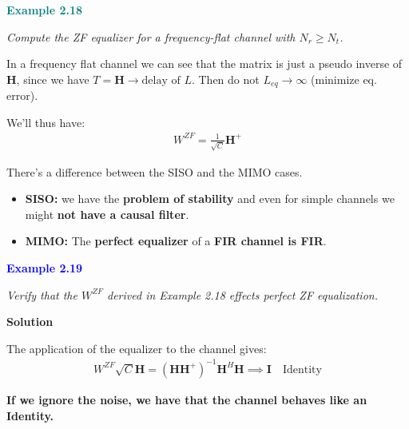 \documentclass[a4paper, 12pt]{book}
\begin{document}
\begin{tcolorbox}[colback=teal!5, colframe=teal, boxrule=0.5pt, sharp corners]
    \textbf{\textcolor{teal}{ Example 2.18}}
    \vspace{0.5em}
    
    \textit{Compute the ZF equalizer for a frequency-flat channel with $N_r \geq N_t$.}
    \vspace{0.5em}
    
    In a frequency flat channel we can see that the matrix is just a pseudo inverse of $\mathbf{H}$, since we have $T = \mathbf{H} \rightarrow \text{delay of } L$.
    Then do not $L_{eq} \to \infty$ (minimize eq. error).
    
    We'll thus have:
    \begin{align}
        W^{ZF} = \frac{1}{\sqrt{C}} \mathbf{H}^+
    \end{align}
\end{tcolorbox}

There's a difference between the SISO and the MIMO cases.
\begin{itemize}
    \item \textbf{SISO:} we have the \textbf{problem of stability} and even for simple channels we might \textbf{not have a causal filter}.
    \item \textbf{MIMO:} The \textbf{perfect equalizer} of a \textbf{FIR channel is FIR}.
\end{itemize}

\begin{tcolorbox}[colback=blue!5, colframe=blue, boxrule=0.5pt, sharp corners]
    \textbf{\textcolor{blue}{ Example 2.19}}
    \vspace{0.5em}
    
    \textit{Verify that the $W^{ZF}$ derived in Example 2.18 effects perfect ZF equalization.}
    \vspace{0.5em}
    
    \textbf{Solution}
    
    The application of the equalizer to the channel gives:
    \begin{align}
        W^{ZF}\sqrt{C}\mathbf{H} = (\mathbf{H}\mathbf{H}^+)^{-1}\mathbf{H}^H \mathbf{H} \implies \mathbf{I} \quad \text{Identity}
    \end{align}
    
    \textbf{If we ignore the noise, we have that the channel behaves like an Identity.}
\end{tcolorbox}
\end{document}
